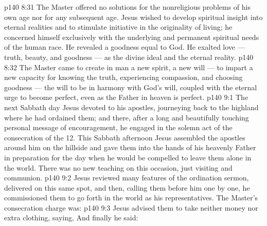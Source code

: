 \vs p140 8:31 The Master offered no solutions for the nonreligious problems of his own age nor for any subsequent age. Jesus wished to develop spiritual insight into eternal realities and to stimulate initiative in the originality of living; he concerned himself exclusively with the underlying and permanent spiritual needs of the human race. He revealed a goodness equal to God. He exalted love --- truth, beauty, and goodness --- as the divine ideal and the eternal reality.
\vs p140 8:32 The Master came to create in man a new spirit, a new will --- to impart a new capacity for knowing the truth, experiencing compassion, and choosing goodness --- the will to be in harmony with God’s will, coupled with the eternal urge to become perfect, even as the Father in heaven is perfect.
\vs p140 9:1 The next Sabbath day Jesus devoted to his apostles, journeying back to the highland where he had ordained them; and there, after a long and beautifully touching personal message of encouragement, he engaged in the solemn act of the consecration of the 12. This Sabbath afternoon Jesus assembled the apostles around him on the hillside and gave them into the hands of his heavenly Father in preparation for the day when he would be compelled to leave them alone in the world. There was no new teaching on this occasion, just visiting and communion.
\vs p140 9:2 Jesus reviewed many features of the ordination sermon, delivered on this same spot, and then, calling them before him one by one, he commissioned them to go forth in the world as his representatives. The Master’s consecration charge was: 
\vs p140 9:3 Jesus advised them to take neither money nor extra clothing, saying,  And finally he said: 
